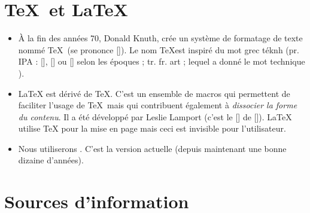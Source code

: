 









%


\section{\TeX\ et \LaTeX}

\begin{itemize}
  \vfill
\item \`A la fin des années 70, Donald Knuth, crée un système de
  formatage de texte nommé \TeX\ (se prononce []). Le nom
  \og \TeX \fg est inspiré du mot grec \textgreek{téknh} (pr. IPA :
  [],
  [] ou
  [] selon les époques ; tr. fr. \og art \fg
  ; lequel a donné le mot \og technique \fg).
\item \LaTeX{} est dérivé de \TeX. C'est un ensemble de macros qui
  permettent de faciliter l'usage de \TeX\ mais qui contribuent
  également à \emph{dissocier la forme du contenu}. Il a été développé
  par Leslie Lamport (c'est le [] de
  []). \LaTeX{} utilise \TeX{} pour la mise en page
  mais ceci est invisible pour l'utilisateur.
\item Nous utiliserons \LaTeXe. C'est la version actuelle (depuis
  maintenant une bonne dizaine d'années). \vfill
\end{itemize}



\section{Sources d'information}


